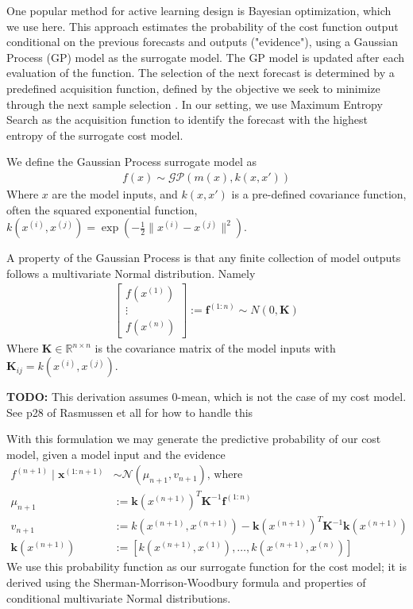 \documentclass[10pt,twocolumn,letterpaper]{article}
\begin{document}
One popular method for active learning design is Bayesian optimization, which we use here. This approach estimates the probability of the cost function output conditional on the previous forecasts and outputs ("evidence"), using a Gaussian Process (GP) model as the surrogate model. The GP model is updated after each evaluation of the function. The selection of the next forecast is determined by a predefined acquisition function, defined by the objective we seek to minimize through the next sample selection \cite{brochu2010tutorial} \cite{wang2022intuitive}. In our setting, we use Maximum Entropy Search as the acquisition function to identify the forecast with the highest entropy of the surrogate cost model.

We define the Gaussian Process surrogate model as
\begin{align*}
    f(x) \sim \mathcal{GP}(m(x), k(x, x'))
\end{align*}
Where $x$ are the model inputs, and $k(x, x')$ is a pre-defined covariance function, often the squared exponential function, $k(x^{(i)}, x^{(j)}) = \exp\left(-\frac{1}{2}\lVert x^{(i)} - x^{(j)}\rVert^2\right)$. 

A property of the Gaussian Process is that any finite collection of model outputs follows a multivariate Normal distribution. Namely
\begin{align*}
    \begin{bmatrix}
        f(x^{(1)})\\\vdots\\f(x^{(n)})
    \end{bmatrix} := \textbf{f}^{(1:n)} \sim N(0, \textbf{K})
\end{align*}
Where $\textbf{K}\in \mathbb{R}^{n\times n}$ is the covariance matrix of the model inputs with $\textbf{K}_{ij} = k(x^{(i)}, x^{(j)})$.

\textbf{TODO:} This derivation assumes 0-mean, which is not the case of my cost model. See p28 of Rasmussen et all for how to handle this \cite{Rasmussen}

With this formulation we may generate the predictive probability of our cost model, given a model input and the evidence
\begin{align*}
    f^{(n+1)} \mid \textbf{x}^{(1:n+1)} &\sim \mathcal{N}(\mu_{n+1}, v_{n+1}) \textrm{, where}\\
    \mu_{n+1} &:= \textbf{k}(x^{(n+1)})^T\textbf{K}^{-1}\textbf{f}^{(1:n)}\\
    v_{n+1} &:= k(x^{(n+1)}, x^{(n+1)}) - \textbf{k}(x^{(n+1)})^T\textbf{K}^{-1}\textbf{k}(x^{(n+1)})\\
    \textbf{k}(x^{(n+1)}) &:= \left[k(x^{(n+1)}, x^{(1)}), \dots, k(x^{(n+1)}, x^{(n)})\right]
\end{align*}
We use this probability function as our surrogate function for the cost model; it is derived using the Sherman-Morrison-Woodbury formula and properties of conditional multivariate Normal distributions. 
\end{document}
